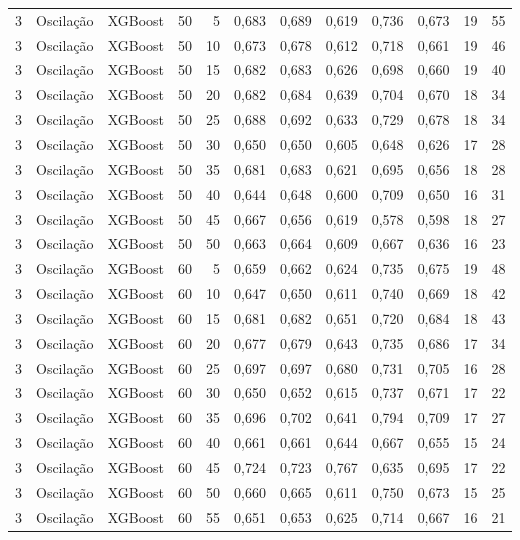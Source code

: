 \begin{longtable}{@{}rllrrrrrrrrr@{}}
3 & Oscilação & XGBoost & 50 & 5 & 0,683 & 0,689 & 0,619 & 0,736 & 0,673 & 19 & 55 \\
3 & Oscilação & XGBoost & 50 & 10 & 0,673 & 0,678 & 0,612 & 0,718 & 0,661 & 19 & 46 \\
3 & Oscilação & XGBoost & 50 & 15 & 0,682 & 0,683 & 0,626 & 0,698 & 0,660 & 19 & 40 \\
3 & Oscilação & XGBoost & 50 & 20 & 0,682 & 0,684 & 0,639 & 0,704 & 0,670 & 18 & 34 \\
3 & Oscilação & XGBoost & 50 & 25 & 0,688 & 0,692 & 0,633 & 0,729 & 0,678 & 18 & 34 \\
3 & Oscilação & XGBoost & 50 & 30 & 0,650 & 0,650 & 0,605 & 0,648 & 0,626 & 17 & 28 \\
3 & Oscilação & XGBoost & 50 & 35 & 0,681 & 0,683 & 0,621 & 0,695 & 0,656 & 18 & 28 \\
3 & Oscilação & XGBoost & 50 & 40 & 0,644 & 0,648 & 0,600 & 0,709 & 0,650 & 16 & 31 \\
3 & Oscilação & XGBoost & 50 & 45 & 0,667 & 0,656 & 0,619 & 0,578 & 0,598 & 18 & 27 \\
3 & Oscilação & XGBoost & 50 & 50 & 0,663 & 0,664 & 0,609 & 0,667 & 0,636 & 16 & 23 \\
3 & Oscilação & XGBoost & 60 & 5 & 0,659 & 0,662 & 0,624 & 0,735 & 0,675 & 19 & 48 \\
3 & Oscilação & XGBoost & 60 & 10 & 0,647 & 0,650 & 0,611 & 0,740 & 0,669 & 18 & 42 \\
3 & Oscilação & XGBoost & 60 & 15 & 0,681 & 0,682 & 0,651 & 0,720 & 0,684 & 18 & 43 \\
3 & Oscilação & XGBoost & 60 & 20 & 0,677 & 0,679 & 0,643 & 0,735 & 0,686 & 17 & 34 \\
3 & Oscilação & XGBoost & 60 & 25 & 0,697 & 0,697 & 0,680 & 0,731 & 0,705 & 16 & 28 \\
3 & Oscilação & XGBoost & 60 & 30 & 0,650 & 0,652 & 0,615 & 0,737 & 0,671 & 17 & 22 \\
3 & Oscilação & XGBoost & 60 & 35 & 0,696 & 0,702 & 0,641 & 0,794 & 0,709 & 17 & 27 \\
3 & Oscilação & XGBoost & 60 & 40 & 0,661 & 0,661 & 0,644 & 0,667 & 0,655 & 15 & 24 \\
3 & Oscilação & XGBoost & 60 & 45 & 0,724 & 0,723 & 0,767 & 0,635 & 0,695 & 17 & 22 \\
3 & Oscilação & XGBoost & 60 & 50 & 0,660 & 0,665 & 0,611 & 0,750 & 0,673 & 15 & 25 \\
3 & Oscilação & XGBoost & 60 & 55 & 0,651 & 0,653 & 0,625 & 0,714 & 0,667 & 16 & 21 \\

\end{longtable}
